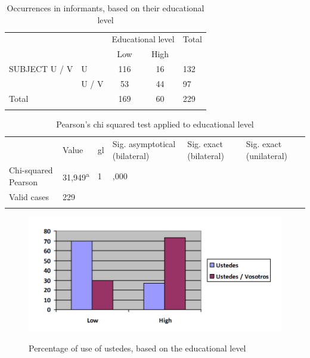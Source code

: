 \documentclass[output=paper]{LSP/langsci}
\begin{document}
\begin{table}
\begin{tabular}{ll|cc|l}
\lsptoprule
& & \multicolumn{2}{c|}{Educational level} & Total\\
& & Low & High & \\
SUBJECT U / V & U & 116 & 16 & 132\\
& U / V & 53 & 44 & 97\\
Total & & 169 & 60 & 229\\
\lspbottomrule
\end{tabular}
\caption{Occurrences in informants, based on their educational level}
\label{tab:8}
\end{table} 

\begin{table}
\begin{tabular}{llllll}
\lsptoprule
\multicolumn{6}{c}{\bfseries Pearson’s chi squared}\\
\midrule
& Value & gl & 
\begin{minipage}[t]{0.15\textwidth}Sig. asymptotical (bilateral)\end{minipage} & 
\begin{minipage}[t]{0.15\textwidth}Sig. exact (bilateral)\end{minipage} & 
\begin{minipage}[t]{0.15\textwidth}Sig. exact (unilateral)\end{minipage} \\
\midrule
\begin{minipage}[t]{0.15\textwidth}Chi-squared Pearson\end{minipage} & 31,949\textsuperscript{a} & 1 & ,000 &  & \\
\begin{minipage}[t]{0.15\textwidth}Valid cases\end{minipage} & 229 &  &  &  & \\
\lspbottomrule
\end{tabular}
\label{tab:9}
\caption{Pearson’s chi squared test applied to educational level} 
\end{table}

\begin{figure}
\includegraphics[width=\textwidth]{illustrations/lara_fig5}
\label{fig:5}
\caption{Percentage of use of ustedes, based on the educational level}
\end{figure}
\end{document}
